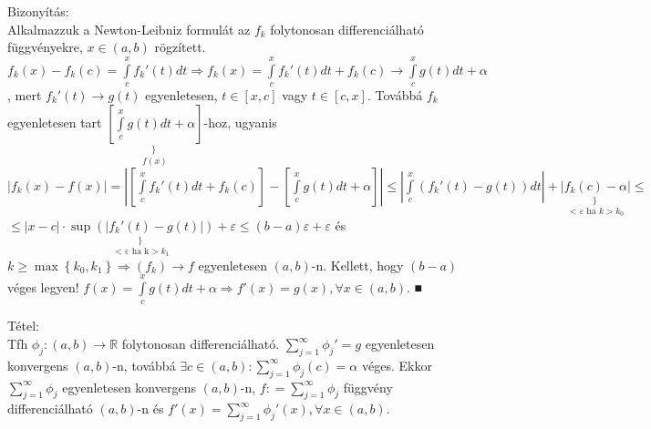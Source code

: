 \documentclass[12pt,a4paper]{scrartcl}
\newenvironment{tetel}{}{}
\begin{document}
\begin{biz_extra}

Bizonyítás:\\
Alkalmazzuk a Newton-Leibniz formulát az \(f_{k}\) folytonosan
differenciálható függvényekre, \(x \in \left( {a,b} \right)\) rögzített.
\(\left. f_{k}\left( x \right) - f_{k}\left( c \right) = {\int\limits_{c}^{x}{f_{k}'\left( t \right)dt}}\Rightarrow f_{k}\left( x \right) = {\int\limits_{c}^{x}{f_{k}'\left( t \right)dt}} + f_{k}\left( c \right)\rightarrow{\int\limits_{c}^{x}{g\left( t \right)dt}} + \alpha \right.\),
mert
\(\left. f_{k}'\left( t \right)\rightarrow g\left( t \right) \right.\)
egyenletesen, \(t \in \left\lbrack {x,c} \right\rbrack\) vagy
\(t \in \left\lbrack {c,x} \right\rbrack\). Továbbá \(f_{k}\)
egyenletesen tart
\(\underset{f{(x)}}{\underset{\}\ }{\left\lbrack {\int\limits_{c}^{x}{g\left( t \right)dt + \alpha}} \right\rbrack}}\)-hoz,
ugyanis
\(\left| {f_{k}\left( x \right) - f\left( x \right)} \right| = \left| {\left\lbrack {{\int\limits_{c}^{x}{f_{k}'\left( t \right)dt}} + f_{k}\left( c \right)} \right\rbrack - \left\lbrack {\int\limits_{c}^{x}{g\left( t \right)dt + \alpha}} \right\rbrack} \right| \leq \left| {\int\limits_{c}^{x}{\left( {f_{k}'\left( t \right) - g\left( t \right)} \right)dt}} \right| + \underset{< \varepsilon\text{~ha~}k > k_{0}}{\underset{\}\ }{\left| {f_{k}\left( c \right) - \alpha} \right|}} \leq\)
\(\leq \left| {x - c} \right| \cdot \underset{< \varepsilon\text{~ha~k} > k_{1}}{\underset{\}\ }{\sup\left( \left| {f_{k}'\left( t \right) - g\left( t \right)} \right| \right)}} + \varepsilon \leq \left( {b - a} \right)\varepsilon + \varepsilon\)
és
\(\left. k \geq \max\left\{ {k_{0},k_{1}} \right\}\Rightarrow\left( f_{k} \right)\rightarrow f \right.\)
egyenletesen \(\left( {a,b} \right)\)-n. Kellett, hogy
\(\left( {b - a} \right)\) véges legyen!
\(\left. f\left( x \right) = {\int\limits_{c}^{x}{g\left( t \right)dt}} + \alpha\Rightarrow f'\left( x \right) = g\left( x \right),\forall x \in \left( {a,b} \right) \right.\).
■

\end{biz_extra}

\begin{tetel}

Tétel:\\
Tfh
\(\left. \phi_{j}:\left( {a,b} \right)\rightarrow{\mathbb{R}} \right.\)
folytonosan differenciálható.
\({\sum\limits_{j = 1}^{\infty}{\phi_{j}'}} = g\) egyenletesen
konvergens \(\left( {a,b} \right)\)-n, továbbá
\(\exists c \in \left( {a,b} \right):{\sum\limits_{j = 1}^{\infty}{\phi_{j}\left( c \right)}} = \alpha\)
véges. Ekkor \(\sum\limits_{j = 1}^{\infty}\phi_{j}\) egyenletesen
konvergens \(\left( {a,b} \right)\)-n,
\(f: = {\sum\limits_{j = 1}^{\infty}\phi_{j}}\) függvény
differenciálható \(\left( {a,b} \right)\)-n és
\(f'\left( x \right) = {\sum\limits_{j = 1}^{\infty}{\phi_{j}'\left( x \right)}},\forall x \in \left( {a,b} \right)\).

\end{tetel}
\end{document}
